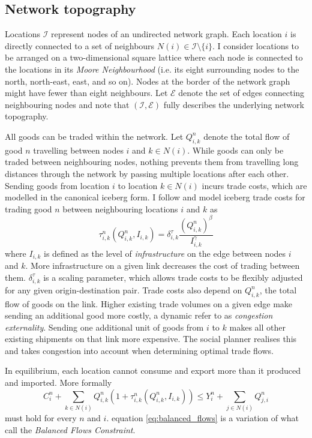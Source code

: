 \documentclass[11pt, oneside]{article}   	%
\begin{document}
\subsection{Network topography}
Locations $\mathcal{I}$ represent nodes of an undirected network graph. Each location $i$ is directly connected to a set of neighbours $N(i) \in \mathcal{I} \setminus \{ i\}$. I consider locations to be arranged on a two-dimensional square lattice where each node is connected to the locations in its \emph{Moore Neighbourhood} (i.e. its eight surrounding nodes to the north, north-east, east, and so on). Nodes at the border of the network graph might have fewer than eight neighbours. Let $\mathcal{E}$ denote the set of edges connecting neighbouring nodes and note that $(\mathcal{I}, \mathcal{E})$ fully describes the underlying network topography.

All goods can be traded within the network. Let $Q_{i,k}^{n}$ denote the total flow of good $n$ travelling between nodes $i$ and $k \in N(i)$. While goods can only be traded between neighbouring nodes, nothing prevents them from travelling long distances through the network by passing multiple locations after each other. Sending goods from location $i$ to location $k \in N(i)$ incurs trade costs, which are modelled in the canonical iceberg form. I follow \citeauthor{Fajgelbaum_OptimalTransportNetworks_2017} and model iceberg trade costs for trading good $n$ between neighbouring locations $i$ and $k$ as
\begin{equation}
  \tau_{i,k}^{n}(Q_{i,k}^{n}, I_{i,k}) = \delta^{\tau}_{i,k} \frac{(Q_{i,k}^{n})^{\beta}}{I_{i,k}^{\gamma}}
  \label{eq:tau}
\end{equation}
where $I_{i,k}$ is defined as the level of \emph{infrastructure} on the edge between nodes $i$ and $k$. More infrastructure on a given link decreases the cost of trading between them. $\delta^{\tau}_{i,k}$ is a scaling parameter, which allows trade costs to be flexibly adjusted for any given origin-destination pair. Trade costs also depend on $Q_{i,k}^{n}$, the total flow of goods on the link. Higher existing trade volumes on a given edge make sending an additional good more costly, a dynamic \citeauthor{Fajgelbaum_OptimalTransportNetworks_2017} refer to as \emph{congestion externality}. Sending one additional unit of goods from $i$ to $k$ makes all other existing shipments on that link more expensive. The social planner realises this and takes congestion into account when determining optimal trade flows.

In equilibrium, each location cannot consume and export more than it produced and imported. More formally
\begin{equation}
  C_{i}^{n} + \sum_{k\in N(i)}^{}Q_{i,k}^{n}(1+\tau_{i,k}^{n}(Q_{i,k}^{n}, I_{i,k})) \leq Y_{i}^{n} + \sum_{j\in N(i)}^{}Q_{j,i}^{n}
  \label{eq:balanced_flows}
\end{equation}
must hold for every $n$ and $i$. equation \eqref{eq:balanced_flows} is a variation of what \citeauthor{Fajgelbaum_OptimalTransportNetworks_2017} call the \emph{Balanced Flows Constraint}.
\end{document}
